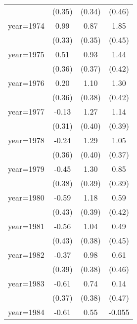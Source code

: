 \begin{table}[htbp]
\begin{tabular}{l*{3}{c}}
                &   (0.35)         &   (0.34)         &   (0.46)         \\
\addlinespace
year=1974       &     0.99\sym{**} &     0.87\sym{*}  &     1.85\sym{***}\\
                &   (0.33)         &   (0.35)         &   (0.45)         \\
\addlinespace
year=1975       &     0.51         &     0.93\sym{*}  &     1.44\sym{**} \\
                &   (0.36)         &   (0.37)         &   (0.42)         \\
\addlinespace
year=1976       &     0.20         &     1.10\sym{**} &     1.30\sym{**} \\
                &   (0.36)         &   (0.38)         &   (0.42)         \\
\addlinespace
year=1977       &    -0.13         &     1.27\sym{**} &     1.14\sym{**} \\
                &   (0.31)         &   (0.40)         &   (0.39)         \\
\addlinespace
year=1978       &    -0.24         &     1.29\sym{**} &     1.05\sym{**} \\
                &   (0.36)         &   (0.40)         &   (0.37)         \\
\addlinespace
year=1979       &    -0.45         &     1.30\sym{**} &     0.85\sym{*}  \\
                &   (0.38)         &   (0.39)         &   (0.39)         \\
\addlinespace
year=1980       &    -0.59         &     1.18\sym{**} &     0.59         \\
                &   (0.43)         &   (0.39)         &   (0.42)         \\
\addlinespace
year=1981       &    -0.56         &     1.04\sym{**} &     0.49         \\
                &   (0.43)         &   (0.38)         &   (0.45)         \\
\addlinespace
year=1982       &    -0.37         &     0.98\sym{*}  &     0.61         \\
                &   (0.39)         &   (0.38)         &   (0.46)         \\
\addlinespace
year=1983       &    -0.61         &     0.74         &     0.14         \\
                &   (0.37)         &   (0.38)         &   (0.47)         \\
\addlinespace
year=1984       &    -0.61         &     0.55         &   -0.055         \\

\end{tabular}
\end{table}
